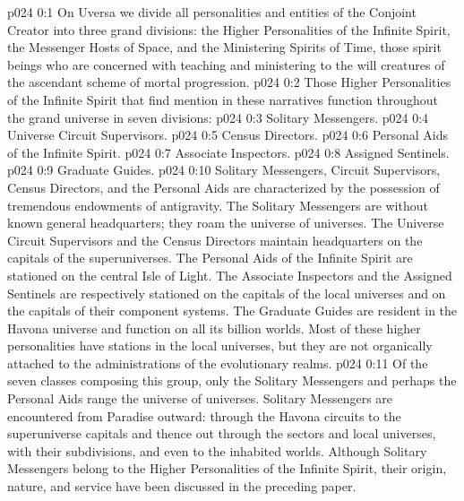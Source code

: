 \author{Divine Counsellor}
\vs p024 0:1 On Uversa we divide all personalities and entities of the Conjoint Creator into three grand divisions: the Higher Personalities of the Infinite Spirit, the Messenger Hosts of Space, and the Ministering Spirits of Time, those spirit beings who are concerned with teaching and ministering to the will creatures of the ascendant scheme of mortal progression.
\vs p024 0:2 \pc Those Higher Personalities of the Infinite Spirit that find mention in these narratives function throughout the grand universe in seven divisions:
\vs p024 0:3 \bibnobreakspace Solitary Messengers.
\vs p024 0:4 \bibnobreakspace Universe Circuit Supervisors.
\vs p024 0:5 \bibnobreakspace Census Directors.
\vs p024 0:6 \bibnobreakspace Personal Aids of the Infinite Spirit.
\vs p024 0:7 \bibnobreakspace Associate Inspectors.
\vs p024 0:8 \bibnobreakspace Assigned Sentinels.
\vs p024 0:9 \bibnobreakspace Graduate Guides.
\vs p024 0:10 \pc Solitary Messengers, Circuit Supervisors, Census Directors, and the Personal Aids are characterized by the possession of tremendous endowments of antigravity. The Solitary Messengers are without known general headquarters; they roam the universe of universes. The Universe Circuit Supervisors and the Census Directors maintain headquarters on the capitals of the superuniverses. The Personal Aids of the Infinite Spirit are stationed on the central Isle of Light. The Associate Inspectors and the Assigned Sentinels are respectively stationed on the capitals of the local universes and on the capitals of their component systems. The Graduate Guides are resident in the Havona universe and function on all its billion worlds. Most of these higher personalities have stations in the local universes, but they are not organically attached to the administrations of the evolutionary realms.
\vs p024 0:11 Of the seven classes composing this group, only the Solitary Messengers and perhaps the Personal Aids range the universe of universes. Solitary Messengers are encountered from Paradise outward: through the Havona circuits to the superuniverse capitals and thence out through the sectors and local universes, with their subdivisions, and even to the inhabited worlds. Although Solitary Messengers belong to the Higher Personalities of the Infinite Spirit, their origin, nature, and service have been discussed in the preceding paper.
